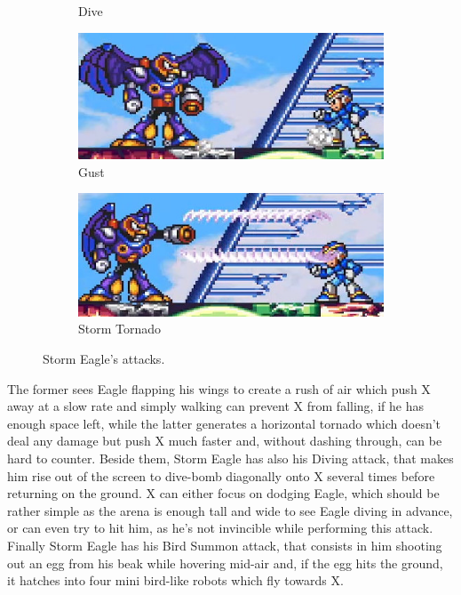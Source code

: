 \begin{figure}[htp]
\begin{subfigure}{0.35\linewidth}
	 	\caption{Dive}
	\end{subfigure}
 	\begin{subfigure}{0.4\linewidth}
 		\centering
 		\includegraphics[width=\linewidth]{figures/X1/Storm_eagle/Eagle_push.jpg}
 		\caption{Gust}
 	\end{subfigure}
 	\begin{subfigure}{0.4\linewidth}
 		\centering
 		\includegraphics[width=\linewidth]{figures/X1/Storm_eagle/Eagle_tornado.jpg}
 		\caption{Storm Tornado}
 	\end{subfigure}
 	\caption{Storm Eagle's attacks.}
 \end{figure}


 The former sees Eagle flapping his wings to create a rush of air which push X away at a slow rate and simply walking can prevent X from falling, if he has enough space left, while the latter generates a horizontal tornado which doesn't deal any damage but push X much faster and, without dashing through, can be hard to counter. Beside them, Storm Eagle has also his Diving attack, that makes him rise out of the screen to dive-bomb diagonally onto X several times before returning on the ground. X can either focus on dodging Eagle, which should be rather simple as the arena is enough tall and wide to see Eagle diving in advance, or can even try to hit him, as he's not invincible while performing this attack. Finally Storm Eagle has his Bird Summon attack, that consists in him shooting out an egg from his beak while hovering mid-air and, if the egg hits the ground, it hatches into four mini bird-like robots which fly towards X. 

